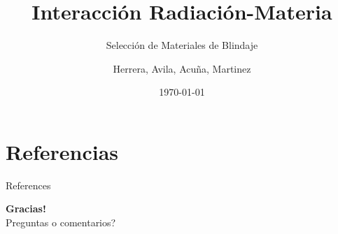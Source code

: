 \documentclass[aspectratio=169,sn-mathphys-num]{beamer}
\title{Interacción Radiación-Materia}
\subtitle{Selección de Materiales de Blindaje}
\author{Herrera, Avila, Acuña, Martinez}
\institute{Universidad Distrital Francisco José de Caldas}
\date{\today}
\begin{document}
\begin{frame}
	\titlepage
\end{frame}







\section{Referencias}
\begin{frame}[allowframebreaks]{References}
	\printbibliography
	\nocite{*}
\end{frame}

\begin{frame}[plain]
	\centering
	\vspace{1cm}
	{\Huge \textbf{Gracias!}}\\[1cm]
	{\large Preguntas o comentarios?}
\end{frame}
\end{document}
